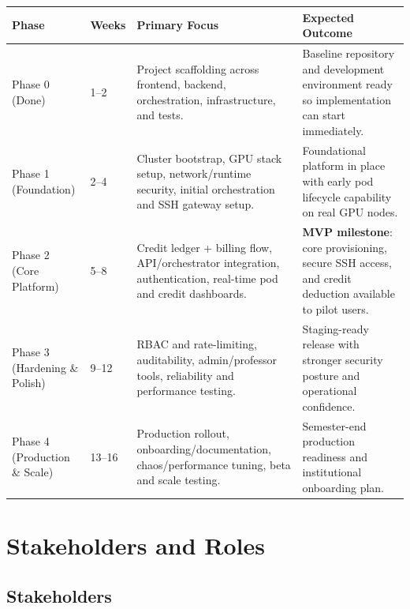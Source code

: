\documentclass[12pt,a4paper]{article}
\begin{document}
\begin{tabularx}{\textwidth}{@{}L{2.4cm}C{1.2cm}L{4.8cm}X@{}}
   \textbf{Phase} & \textbf{Weeks} & \textbf{Primary Focus} & \textbf{Expected Outcome} \\
  \midrule
  Phase 0 (Done)
    & 1--2
    & Project scaffolding across frontend, backend, orchestration, infrastructure, and tests.
    & Baseline repository and development environment ready so implementation can start immediately. \\
  Phase 1 (Foundation)
    & 2--4
    & Cluster bootstrap, GPU stack setup, network/runtime security, initial orchestration and SSH gateway setup.
    & Foundational platform in place with early pod lifecycle capability on real GPU nodes. \\
  Phase 2 (Core Platform)
    & 5--8
    & Credit ledger + billing flow, API/orchestrator integration, authentication, real-time pod and credit dashboards.
    & \textbf{MVP milestone}: core provisioning, secure SSH access, and credit deduction available to pilot users. \\
  Phase 3 (Hardening \& Polish)
    & 9--12
    & RBAC and rate-limiting, auditability, admin/professor tools, reliability and performance testing.
    & Staging-ready release with stronger security posture and operational confidence. \\
  Phase 4 (Production \& Scale)
    & 13--16
    & Production rollout, onboarding/documentation, chaos/performance tuning, beta and scale testing.
    & Semester-end production readiness and institutional onboarding plan. \\
\end{tabularx}

\newpage
\section{Stakeholders and Roles}

\subsection{Stakeholders}
\end{document}
